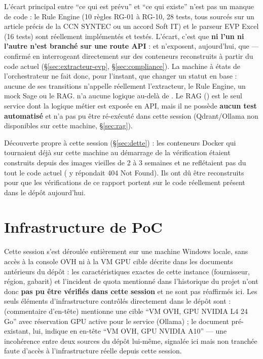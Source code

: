 \documentclass[11pt,a4paper]{article}
\begin{document}
L'\'ecart principal entre ``ce qui est pr\'evu'' et ``ce qui existe'' n'est pas un manque de code : le Rule Engine (10 r\`egles RG-01 \`a RG-10, 28 tests, tous sourc\'es sur un article pr\'ecis de la CCN SYNTEC ou un accord Soft IT) et le parseur EVP Excel (16 tests) sont r\'eellement impl\'ement\'es et test\'es. L'\'ecart, c'est que \textbf{ni l'un ni l'autre n'est branch\'e sur une route API} :  et  n'exposent, aujourd'hui, que  --- confirm\'e en interrogeant directement  sur des conteneurs reconstruits \`a partir du code actuel (\S\ref{sec:extracteur-evp}, \S\ref{sec:compliance}). La machine \`a \'etats de l'orchestrateur ne fait donc, pour l'instant, que changer un statut en base : aucune de ses transitions n'appelle r\'eellement l'extracteur, le Rule Engine, un mock Sage ou le RAG.  n'a aucune logique au-del\`a de . Le RAG () est le seul service dont la logique m\'etier est expos\'ee en API, mais il ne poss\`ede \textbf{aucun test automatis\'e} et n'a pas pu \^etre r\'e-ex\'ecut\'e dans cette session (Qdrant/Ollama non disponibles sur cette machine, \S\ref{sec:rag}).

D\'ecouverte propre \`a cette session (\S\ref{sec:dette}) : les conteneurs Docker qui tournaient d\'ej\`a sur cette machine au d\'emarrage de la v\'erification \'etaient construits depuis des images vieilles de 2 \`a 3 semaines et ne refl\'etaient pas du tout le code actuel ( y r\'epondait 404 Not Found). Ils ont d\^u \^etre reconstruits pour que les v\'erifications de ce rapport portent sur le code r\'eellement pr\'esent dans le d\'ep\^ot aujourd'hui.

\section{Infrastructure de PoC}

Cette session s'est d\'eroul\'ee enti\`erement sur une machine Windows locale, sans acc\`es \`a la console OVH ni \`a la VM GPU cible d\'ecrite dans les documents ant\'erieurs du d\'ep\^ot : les caract\'eristiques exactes de cette instance (fournisseur, r\'egion, gabarit) et l'incident de quota mentionn\'e dans l'historique du projet n'ont donc \textbf{pas pu \^etre v\'erifi\'es dans cette session} et ne sont pas r\'eaffirm\'es ici. Les seuls \'el\'ements d'infrastructure contr\^ol\'es directement dans le d\'ep\^ot sont :  (commentaire d'en-t\^ete) mentionne une cible ``VM OVH, GPU NVIDIA L4 24\,Go'' avec r\'eservation GPU  active pour le service  (Ollama) ; le document  pr\'e-existant, lui, indique en en-t\^ete ``VM OVH, GPU NVIDIA A10'' --- une incoh\'erence entre deux sources du d\'ep\^ot lui-m\^eme, signal\'ee ici mais non tranch\'ee faute d'acc\`es \`a l'infrastructure r\'eelle depuis cette session.
\end{document}
